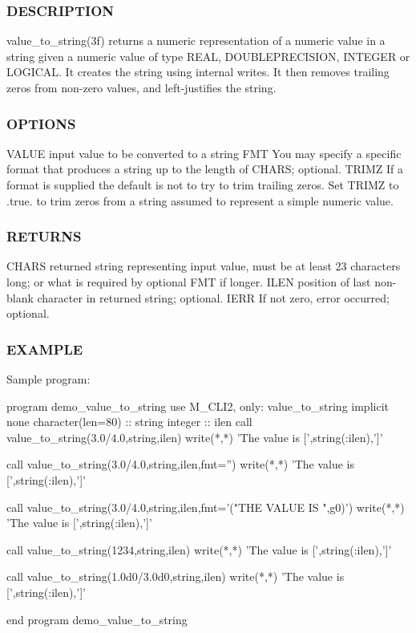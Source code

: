  \subsubsection*{D\+E\+S\+C\+R\+I\+P\+T\+I\+ON}

\begin{DoxyVerb}value_to_string(3f) returns a numeric representation of a numeric
value in a string given a numeric value of type REAL, DOUBLEPRECISION,
INTEGER or LOGICAL. It creates the string using internal writes. It
then removes trailing zeros from non-zero values, and left-justifies
the string.
\end{DoxyVerb}


\subsubsection*{O\+P\+T\+I\+O\+NS}

V\+A\+L\+UE input value to be converted to a string F\+MT You may specify a specific format that produces a string up to the length of C\+H\+A\+RS; optional. T\+R\+I\+MZ If a format is supplied the default is not to try to trim trailing zeros. Set T\+R\+I\+MZ to .true. to trim zeros from a string assumed to represent a simple numeric value.

\subsubsection*{R\+E\+T\+U\+R\+NS}

C\+H\+A\+RS returned string representing input value, must be at least 23 characters long; or what is required by optional F\+MT if longer. I\+L\+EN position of last non-\/blank character in returned string; optional. I\+E\+RR If not zero, error occurred; optional. \subsubsection*{E\+X\+A\+M\+P\+LE}

Sample program\+: \begin{DoxyVerb} program demo_value_to_string
 use M_CLI2, only: value_to_string
 implicit none
 character(len=80) :: string
 integer           :: ilen
    call value_to_string(3.0/4.0,string,ilen)
    write(*,*) 'The value is [',string(:ilen),']'

    call value_to_string(3.0/4.0,string,ilen,fmt='')
    write(*,*) 'The value is [',string(:ilen),']'

    call value_to_string(3.0/4.0,string,ilen,fmt='("THE VALUE IS ",g0)')
    write(*,*) 'The value is [',string(:ilen),']'

    call value_to_string(1234,string,ilen)
    write(*,*) 'The value is [',string(:ilen),']'

    call value_to_string(1.0d0/3.0d0,string,ilen)
    write(*,*) 'The value is [',string(:ilen),']'

 end program demo_value_to_string
\end{DoxyVerb}


